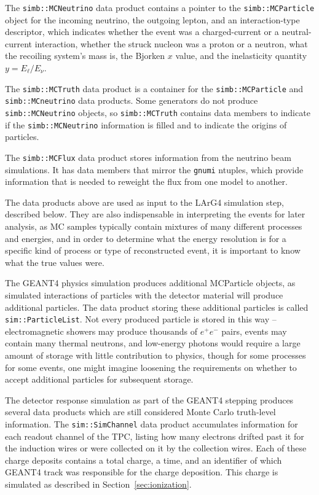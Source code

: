 \documentclass[12pt]{elsarticle}
\begin{document}
The {\tt simb::MCNeutrino} data product contains a pointer to the {\tt simb::MCParticle} object for
the incoming neutrino, the outgoing lepton, and an interaction-type descriptor,
which indicates whether the event was a charged-current or a neutral-current interaction,
whether the struck nucleon was a proton or a neutron, what the recoiling system's mass is,
the Bjorken $x$ value, and the inelasticity quantity $y=E_\ell/E_\nu$.

The {\tt simb::MCTruth} data product is a container for the {\tt simb::MCParticle} and {\tt simb::MCneutrino}
data products.  Some generators do not produce {\tt simb::MCNeutrino} objects, so {\tt simb::MCTruth}
contains data members to indicate if the {\tt simb::MCNeutrino} information is filled and to indicate
the origins of particles.
 
The {\tt simb::MCFlux} data product stores information from the neutrino beam simulations.
It has data members that mirror the {\tt gnumi} ntuples, which provide information that
is needed to reweight the flux from one model to another.

The data products above are used as input to the LArG4 simulation step, described below.
They are also indispensable in interpreting the events for later analysis, as MC
samples typically contain mixtures of many different processes and energies, and
in order to determine what the energy resolution is for a specific kind of process
or type of reconstructed event, it is important to know what the true values were.

The GEANT4 physics simulation produces additional MCParticle objects, as simulated interactions
of particles with the detector material will produce additional particles.  The data product
storing these additional particles is called {\tt sim::ParticleList}.  Not every produced particle
is stored in this way -- electromagnetic showers may produce thousands of $e^+e^-$ pairs, events
may contain many thermal neutrons, and low-energy photons would require a large amount of storage
with little contribution to physics, though for some processes for some events, one might imagine
loosening the requirements on whether to accept additional particles for subsequent storage.

The detector response simulation as part of the GEANT4 stepping
produces several data products which are still considered Monte Carlo
truth-level information.  The {\tt sim::SimChannel} data product accumulates information for each
readout channel of the TPC, listing how many electrons drifted past it for the induction wires or
were collected on it by the collection wires.  Each of these charge deposits contains a total
charge, a time, and an identifier of which GEANT4 track was responsible for the charge deposition.
This charge is simulated as described in Section~\ref{sec:ionization}.
\end{document}
